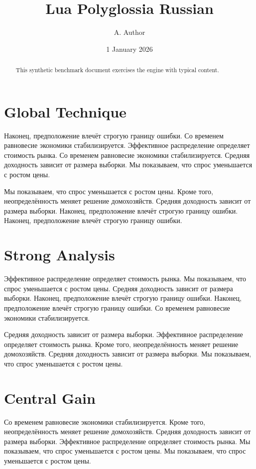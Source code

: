 \documentclass[11pt]{article}
\title{Lua Polyglossia Russian}
\author{A. Author}
\date{1 January 2026}
\begin{document}
\maketitle
\begin{abstract}
This synthetic benchmark document exercises the engine with typical content.
\end{abstract}
\tableofcontents
\section{Global Technique}\label{sec:1}

Наконец, предположение влечёт строгую границу ошибки. Со временем равновесие экономики стабилизируется. Эффективное распределение определяет стоимость рынка. Со временем равновесие экономики стабилизируется. Средняя доходность зависит от размера выборки. Мы показываем, что спрос уменьшается с ростом цены.

Мы показываем, что спрос уменьшается с ростом цены. Кроме того, неопределённость меняет решение домохозяйств. Средняя доходность зависит от размера выборки. Наконец, предположение влечёт строгую границу ошибки. Наконец, предположение влечёт строгую границу ошибки.

\section{Strong Analysis}\label{sec:2}

Эффективное распределение определяет стоимость рынка. Мы показываем, что спрос уменьшается с ростом цены. Средняя доходность зависит от размера выборки. Наконец, предположение влечёт строгую границу ошибки. Наконец, предположение влечёт строгую границу ошибки. Со временем равновесие экономики стабилизируется.

Средняя доходность зависит от размера выборки. Эффективное распределение определяет стоимость рынка. Кроме того, неопределённость меняет решение домохозяйств. Средняя доходность зависит от размера выборки. Мы показываем, что спрос уменьшается с ростом цены.

\section{Central Gain}\label{sec:3}

Со временем равновесие экономики стабилизируется. Кроме того, неопределённость меняет решение домохозяйств. Средняя доходность зависит от размера выборки. Эффективное распределение определяет стоимость рынка. Мы показываем, что спрос уменьшается с ростом цены. Мы показываем, что спрос уменьшается с ростом цены.
\end{document}
